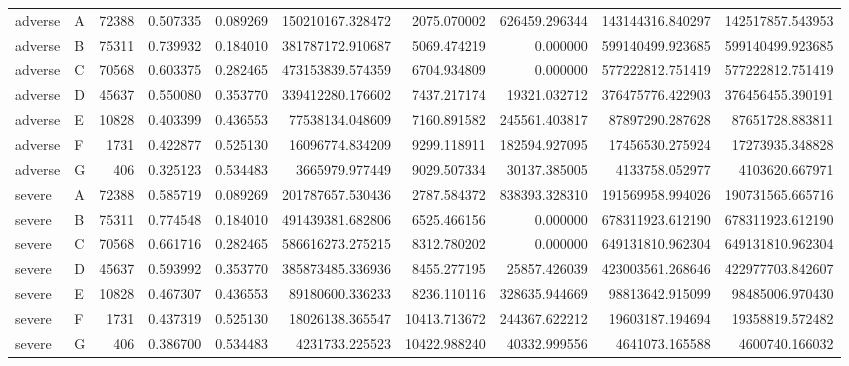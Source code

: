 \begin{tabular}{llrrrrrrrr}
adverse & A & 72388 & 0.507335 & 0.089269 & 150210167.328472 & 2075.070002 & 626459.296344 & 143144316.840297 & 142517857.543953 \\
adverse & B & 75311 & 0.739932 & 0.184010 & 381787172.910687 & 5069.474219 & 0.000000 & 599140499.923685 & 599140499.923685 \\
adverse & C & 70568 & 0.603375 & 0.282465 & 473153839.574359 & 6704.934809 & 0.000000 & 577222812.751419 & 577222812.751419 \\
adverse & D & 45637 & 0.550080 & 0.353770 & 339412280.176602 & 7437.217174 & 19321.032712 & 376475776.422903 & 376456455.390191 \\
adverse & E & 10828 & 0.403399 & 0.436553 & 77538134.048609 & 7160.891582 & 245561.403817 & 87897290.287628 & 87651728.883811 \\
adverse & F & 1731 & 0.422877 & 0.525130 & 16096774.834209 & 9299.118911 & 182594.927095 & 17456530.275924 & 17273935.348828 \\
adverse & G & 406 & 0.325123 & 0.534483 & 3665979.977449 & 9029.507334 & 30137.385005 & 4133758.052977 & 4103620.667971 \\
severe & A & 72388 & 0.585719 & 0.089269 & 201787657.530436 & 2787.584372 & 838393.328310 & 191569958.994026 & 190731565.665716 \\
severe & B & 75311 & 0.774548 & 0.184010 & 491439381.682806 & 6525.466156 & 0.000000 & 678311923.612190 & 678311923.612190 \\
severe & C & 70568 & 0.661716 & 0.282465 & 586616273.275215 & 8312.780202 & 0.000000 & 649131810.962304 & 649131810.962304 \\
severe & D & 45637 & 0.593992 & 0.353770 & 385873485.336936 & 8455.277195 & 25857.426039 & 423003561.268646 & 422977703.842607 \\
severe & E & 10828 & 0.467307 & 0.436553 & 89180600.336233 & 8236.110116 & 328635.944669 & 98813642.915099 & 98485006.970430 \\
severe & F & 1731 & 0.437319 & 0.525130 & 18026138.365547 & 10413.713672 & 244367.622212 & 19603187.194694 & 19358819.572482 \\
severe & G & 406 & 0.386700 & 0.534483 & 4231733.225523 & 10422.988240 & 40332.999556 & 4641073.165588 & 4600740.166032 \\
\bottomrule
\end{tabular}
